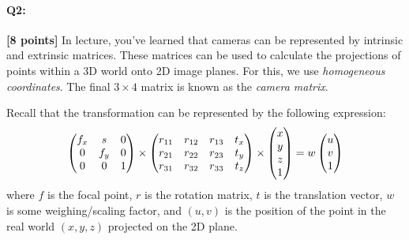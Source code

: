 \pagebreak
\paragraph{Q2:} \textbf{[8 points]}
In lecture, you've learned that cameras can be represented by intrinsic and extrinsic matrices. These matrices can be used to calculate the projections of points within a 3D world onto 2D image planes. For this, we use \emph{homogeneous coordinates}. The final $3\times4$ matrix is known as the \emph{camera matrix}.

Recall that the transformation can be represented by the following expression:
\begin{align*}
    \begin{pmatrix} 
    f_x & s & $0$ \\ 
    $0$ & f_y & $0$ \\ 
    $0$ & $0$ & $1$ \end{pmatrix} \times
    \begin{pmatrix} 
    r_{11} & r_{12} & r_{13} & t_x \\ 
    r_{21} & r_{22} & r_{23} & t_y \\  
    r_{31} & r_{32} & r_{33} & t_z
    \end{pmatrix} \times 
    \begin{pmatrix} 
    x \\ 
    y \\ 
    z \\ 
    $1$ \end{pmatrix}
    = w
    \begin{pmatrix}  u \\ v \\ $1$ \end{pmatrix}
\end{align*}
where $f$ is the focal point, $r$ is the rotation matrix, $t$ is the translation vector,  $w$ is some weighing/scaling factor, and $(u, v)$ is the position of the point in the real world $(x, y, z)$ projected on the 2D plane.

